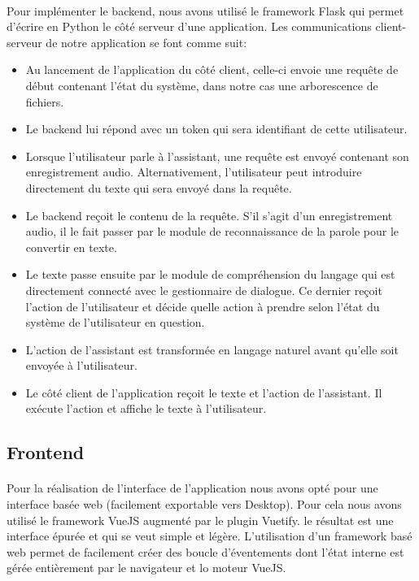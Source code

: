 \paragraph{}Pour implémenter le backend, nous avons utilisé le framework Flask qui permet d'écrire en Python le côté serveur d'une application. Les communications client-serveur de notre application se font comme suit:
\begin{itemize}
	\item Au lancement de l'application du côté client, celle-ci envoie une requête de début contenant l'état du système, dans notre cas une arborescence de fichiers. 
	\item Le backend lui répond avec un token qui sera identifiant de cette utilisateur.
	\item Lorsque l'utilisateur parle à l'assistant, une requête est envoyé contenant son enregistrement audio. Alternativement, l'utilisateur peut introduire directement du texte qui sera envoyé dans la requête.
	\item Le backend reçoit le contenu de la requête. S'il s'agit d'un enregistrement audio, il le fait passer par le module de reconnaissance de la parole pour le convertir en texte.
	\item Le texte passe ensuite par le module de compréhension du langage qui est directement connecté avec le gestionnaire de dialogue. Ce dernier reçoit l'action de l'utilisateur et décide quelle action à prendre selon l'état du système de l'utilisateur en question.
	\item L'action de l'assistant est transformée en langage naturel avant qu'elle soit envoyée à l'utilisateur.
	\item Le côté client de l'application reçoit le texte et l'action de l'assistant. Il exécute l'action et affiche le texte à l'utilisateur.
\end{itemize}

\subsection{Frontend}
\paragraph{}
Pour la réalisation de l'interface de l'application nous avons opté pour une interface basée web (facilement exportable vers Desktop). Pour cela nous avons utilisé le framework VueJS augmenté par le plugin Vuetify. le résultat est une interface épurée et qui se veut simple et légère. L'utilisation d'un framework basé web permet de facilement créer des boucle d'éventements dont l'état interne est gérée entièrement par le navigateur et lo moteur VueJS. 

